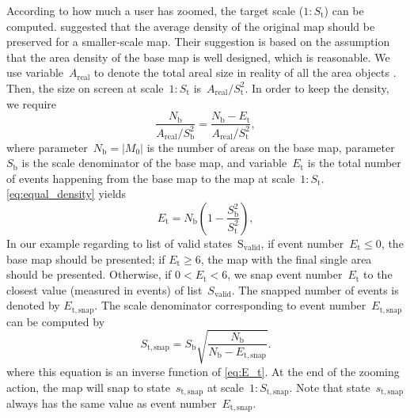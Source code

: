 \documentclass{ica}
\begin{document}
According to how much a user has zoomed,
the target scale (\ie $1:S_\mathrm{t}$) can be computed.
\citet{Huang2016Webmap} suggested that 
the average density of the original map should be preserved 
for a smaller-scale map.
Their suggestion is based on the assumption that 
the area density of the base map is well designed, which is reasonable.
We use variable~$A_\mathrm{real}$ to denote the total areal size in reality
of all the area objects .
Then, the size on screen at scale~$1:S_\mathrm{t}$ 
is~$A_\mathrm{real} \big/ S^2_\mathrm{t}$.
In order to keep the density, we require
\begin{equation}
\label{eq:equal_density}
\frac{N_\mathrm{b}}{A_\mathrm{real} \big/ S^2_\mathrm{b}} =
\frac{N_\mathrm{b}-E_\mathrm{t}}{A_\mathrm{real} \big/ S^2_\mathrm{t}},
\end{equation}
where parameter~$N_\mathrm{b} = |M_0|$ 
is the number of areas on the base map,
parameter~$S_\mathrm{b}$ is the scale denominator of the base map,
and variable~$E_\mathrm{t}$ is the total number of events 
happening from the base map to the map at scale~$1:S_\mathrm{t}$.
\eq\ref{eq:equal_density} yields
\begin{equation}
\label{eq:E_t}
E_\mathrm{t} = N_\mathrm{b} \left(1-\frac{S^2_\mathrm{b}}{S^2_\mathrm{t}}\right),
\end{equation}
In our example regarding to list of valid states~$\mathrm{S_\mathrm{valid}}$,
if event number~$E_\mathrm{t} \le 0$, the base map should be presented;
if $E_\mathrm{t} \ge 6$, 
the map with the final single area should be presented.
Otherwise, if $0<E_\mathrm{t} < 6$, we snap event number~$E_\mathrm{t}$ 
to the closest value (measured in events) of list~$S_\mathrm{valid}$.
The snapped number of events 
is denoted by $E_\mathrm{t,snap}$.
The scale denominator corresponding to event number~$E_\mathrm{t,snap}$
can be computed by 
\begin{equation}
\label{eq:S_t_snap}
S_\mathrm{t,snap} = S_\mathrm{b} \sqrt{\frac{N_\mathrm{b}}{N_\mathrm{b}-E_\mathrm{t,snap}}}.
\end{equation}
where this equation is an inverse function of \eq\ref{eq:E_t}.
At the end of the zooming action, 
the map will snap to state~$s_\mathrm{t,snap}$
at scale~$1:S_\mathrm{t,snap}$.
Note that state~$s_\mathrm{t,snap}$ always has 
the same value as event number~$E_\mathrm{t,snap}$.
\end{document}
